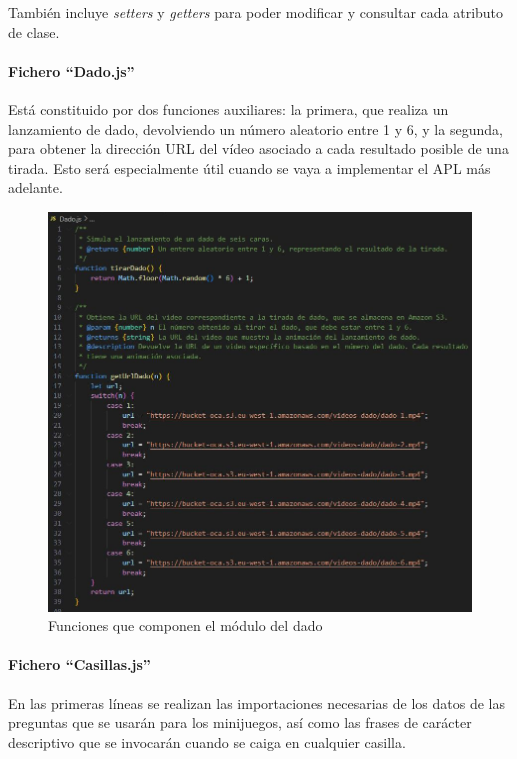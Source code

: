También incluye \textit{setters} y \textit{getters} para poder modificar y consultar cada atributo de clase.

\paragraph{Fichero \enquote{Dado.js}}

Está constituido por dos funciones auxiliares: la primera, que realiza un lanzamiento de dado, devolviendo un número aleatorio entre 1 y 6, y la segunda, para obtener la dirección URL del vídeo asociado a cada resultado posible de una tirada. Esto será especialmente útil cuando se vaya a implementar el APL más adelante.

\begin{figure}[H]
	\centering
	\includegraphics{imgs/codigo-dado.jpg}
	\caption{Funciones que componen el módulo del dado}
	\label{fig:codigo-dado}
\end{figure}

\paragraph{Fichero \enquote{Casillas.js}}

En las primeras líneas se realizan las importaciones necesarias de los datos de las preguntas que se usarán para los minijuegos, así como las frases de carácter descriptivo que se invocarán cuando se caiga en cualquier casilla.

